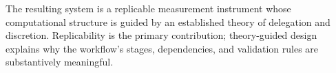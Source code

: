 
The resulting system is a replicable measurement instrument whose
computational structure is guided by an established theory of
delegation and discretion. Replicability is the primary contribution;
theory-guided design explains why the workflow's stages, dependencies,
and validation rules are substantively meaningful.


%
%


%
%
%
